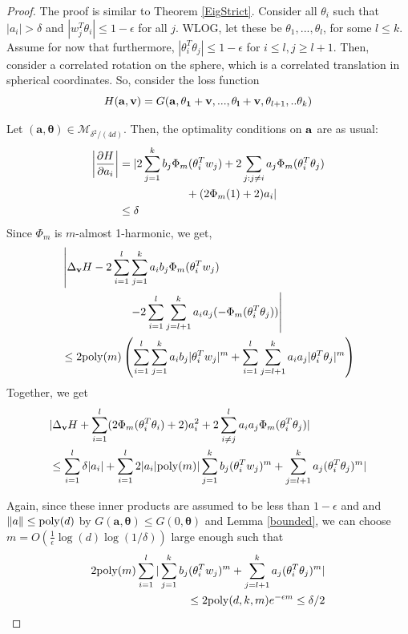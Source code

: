 \documentclass{article}
\newcommand{\pd}[2]{\frac{\partial#1}{\partial#2}}
\begin{document}
\begin{proof}
  The proof is similar to Theorem \ref{EigStrict}. Consider all
  $\theta_i$ such that $|a_i| > \delta$ and
  $|w_j^T\theta_i| \leq 1-\epsilon$ for all $j$. WLOG, let these be
  $\theta_1,...,\theta_l$, for some $l \leq k$. Assume for now that
  furthermore, $|\theta_i^T\theta_j| \leq 1-\epsilon$ for
  $i \leq l, j\geq l+1$.  Then, consider a correlated rotation on the
  sphere, which is a correlated translation in spherical
  coordinates. So, consider the loss function 
%
\[ H({\bf a, v}) = G({\bf a,\theta_1+v,...,\theta_l+v},\theta_{l+1},..\theta_k)\]

Let $(\boldsymbol{a,\theta}) \in \mathcal{M}_{\delta^2/(4d)}$. Then,
the optimality conditions on ${\bf a}$ are as usual:
%
\begin{align*}
   \abs{\pd{H}{a_i}} & = \lvert 2\sum_{j=1}^k b_j \Phi_m(\theta_i^T w_j) +
    2\sum_{j: j\neq i} a_j \Phi_m(\theta_i^T\theta_j) \\
& \qquad \qquad \qquad + (2\Phi_m(1) +
    2)a_i \rvert \\
& \leq \delta 
\end{align*}
%
Since $\Phi_m$ is $m$-almost 1-harmonic, we get,
%
\begin{align*}
  &  \left| \Delta_{{\bf v}} H -  2\sum_{i=1}^l\sum_{j=1}^k a_i b_j
    \Phi_m(\theta_i^Tw_j) \right. \\
& \qquad \qquad \qquad \left.- 2\sum_{i=1}^l\sum_{j= l+1}^k
  a_ia_j(-\Phi_m(\theta_i^T\theta_j)) \right| \\
  & \leq   2\mathrm{poly}(m)\left(\sum_{i=1}^l\sum_{j=1}^k a_i b_j  |\theta_i^Tw_j|^m+\sum_{i=1}^l\sum_{j= l+1}^k a_ia_j|\theta_i^T\theta_j|^m\right)
\end{align*}
%
Together, we get
%
\begin{align*}
& |\Delta_{{\bf v}}H + \sum_{i=1}^l (2\Phi_m(\theta_i^T\theta_i)+2)a_i^2 + 2\sum_{i \neq j}^l a_ia_j\Phi_m(\theta_i^T\theta_j)| \\
& \leq \sum_{i=1}^l\delta |a_i| +\sum_{i=1}^l 2|a_i|\mathrm{poly}(m)|\sum_{j=1}^k b_j
  (\theta_i^Tw_j)^m +  \sum_{j=l+1}^k  a_j(\theta_i^T\theta_j)^m|
\\
\end{align*}

Again, since these inner products are assumed to be less than
$1-\epsilon$ and and $\|a\| \leq \mathrm{poly}(d)$ by
$G(\boldsymbol{a,\theta}) \leq G(0,\boldsymbol{\theta})$ and Lemma
\ref{bounded}, we can choose
$m = O(\frac{1}{\epsilon}\log(d)\log(1/\delta))$ large enough such
that
%
\begin{align*}
 2\mathrm{poly}(m)\sum_{i=1}^l|\sum_{j=1}^k b_j (\theta_i^Tw_j)^m +
  \sum_{j=l+1}^k  a_j(\theta_i^T\theta_j)^m| \\
 \leq  2\mathrm{poly}(d,k,m)e^{-\epsilon m} \leq \delta/2
\end{align*}


\end{proof}
\end{document}
